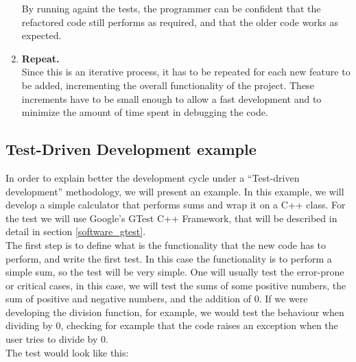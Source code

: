 \begin{enumerate}
	By running againt the tests, the programmer can be confident that the refactored code still performs as required, and that the older code works as expected.\\
	
	\item {\bfseries Repeat.}\\
	Since this is an iterative process, it has to be repeated for each new feature to be added, incrementing the overall functionality of the project. These increments have to be small enough to allow a fast development and to minimize the amount of time spent in debugging the code.\\
\end{enumerate}

\subsection{Test-Driven Development example}
\label{software_TDD_example}

In order to explain better the development cycle under a ``Test-driven development'' methodology, we will present an example. In this example, we will develop a simple calculator that performs sums and wrap it on a C++ class. For the test we will use Google's GTest C++ Framework, that will be described in detail in section \ref{software_gtest}. \\

The first step is to define what is the functionality that the new code has to perform, and write the first test. In this case the functionality is to perform a simple sum, so the test will be very simple. One will usually test the error-prone or critical cases, in this case, we will test the sums of some positive numbers, the sum of positive and negative numbers, and the addition of 0. If we were developing the division function, for example, we would test the behaviour when dividing by 0, checking for example that the code raises an exception when the user tries to divide by 0.\\

The test would look like this:\\

